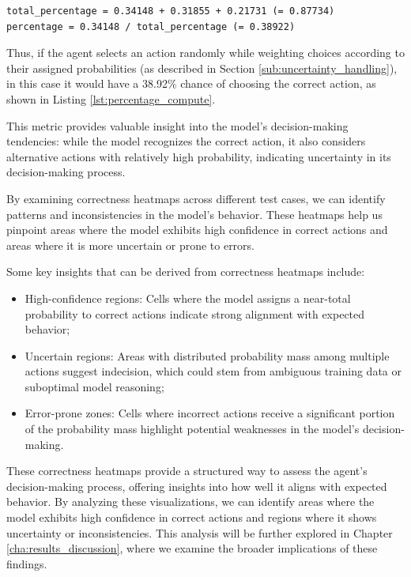 \vspace{5mm}
\begin{codewindow}
  [Text]  \begin{lstlisting}
total_percentage = 0.34148 + 0.31855 + 0.21731 (= 0.87734)
percentage = 0.34148 / total_percentage (= 0.38922)
\end{lstlisting}
\end{codewindow}
\vspace{5mm}

Thus, if the agent selects an action randomly while weighting choices according to
their assigned probabilities (as described in Section
\ref{sub:uncertainty_handling}), in this case it would have a 38.92\% chance of choosing
the correct action, as shown in Listing \ref{lst:percentage_compute}.

This metric provides valuable insight into the model's decision-making
tendencies: while the model recognizes the correct action, it also considers
alternative actions with relatively high probability, indicating uncertainty in its
decision-making process.

By examining correctness heatmaps across different test cases, we can identify
patterns and inconsistencies in the model's behavior. These heatmaps help us pinpoint
areas where the model exhibits high confidence in correct actions and areas where
it is more uncertain or prone to errors.

Some key insights that can be derived from correctness heatmaps include:
\begin{itemize}
  \item High-confidence regions: Cells where the model assigns a near-total
    probability to correct actions indicate strong alignment with expected
    behavior;

  \item Uncertain regions: Areas with distributed probability mass among
    multiple actions suggest indecision, which could stem from ambiguous training
    data or suboptimal model reasoning;

  \item Error-prone zones: Cells where incorrect actions receive a significant
    portion of the probability mass highlight potential weaknesses in the model's
    decision-making.
\end{itemize}
These correctness heatmaps provide a structured way to assess the agent's
decision-making process, offering insights into how well it aligns with expected
behavior. By analyzing these visualizations, we can identify areas where the model
exhibits high confidence in correct actions and regions where it shows uncertainty
or inconsistencies. This analysis will be further explored in Chapter
\ref{cha:results_discussion}, where we examine the broader implications of these
findings.